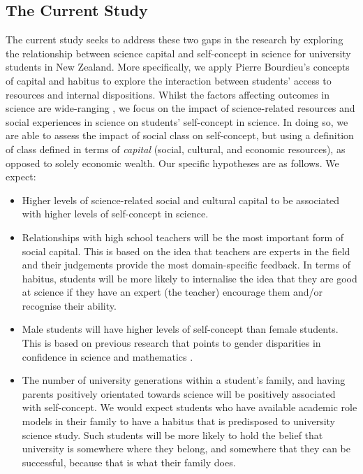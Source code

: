 \subsection{The Current Study}
\label{sec:3}

The current study seeks to address these two gaps in the research by exploring the relationship between science capital and self-concept in science for university students in New Zealand. More specifically, we apply Pierre Bourdieu's \citep{Bourdieu_1986,Bourdieu1984} concepts of capital and habitus to explore the interaction between students' access to resources and internal dispositions. Whilst the factors affecting outcomes in science are wide-ranging 
\citep{osborne2003attitudes}, we focus on the impact of science-related resources and social experiences in science on students' self-concept in science. In doing so, we are able to assess the impact of social class on self-concept, but using a definition of class defined in terms of \textit{capital} (social, cultural, and economic resources), as opposed to solely economic wealth. Our specific hypotheses are as follows. We expect:
\begin{itemize}
    \item Higher levels of science-related social and cultural capital to be associated with higher levels of self-concept in science. 
    \item Relationships with high school teachers will be the most important form of social capital. This is based on the idea that teachers are experts in the field and their judgements provide the most domain-specific feedback. In terms of habitus, students will be more likely to internalise the idea that they are good at science if they have an expert (the teacher) encourage them and/or recognise their ability. 
    \item Male students will have higher levels of self-concept than female students. This is based on previous research that points to gender disparities in confidence in science and mathematics \citep{Else-Quest2013,Ellis_2016}. 
    \item The number of university generations within a student's family, and having parents positively orientated towards science will be positively associated with self-concept. We would expect students who have available academic role models in their family to have a habitus that is predisposed to university science study. Such students will be more likely to  hold the belief that university is somewhere where they belong, and somewhere that they can be successful, because that is what their family does. 
\end{itemize}
